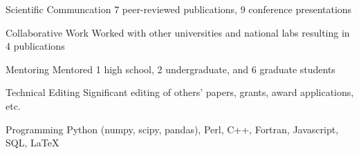 


\begin{cvskills}


\cvskill
{Scientific Communcation} %
{7 peer-reviewed publications, 9 conference presentations} %


\cvskill
{Collaborative Work} %
{Worked with other universities and national labs resulting in 4 publications} %


\cvskill
{Mentoring} %
{Mentored 1 high school, 2 undergraduate, and 6 graduate students} %


\cvskill
{Technical Editing} %
{Significant editing of others' papers, grants, award applications, etc.} %


\cvskill
{Programming} %
{Python (numpy, scipy, pandas), Perl, C++, Fortran, Javascript, SQL, LaTeX} %


\end{cvskills}
